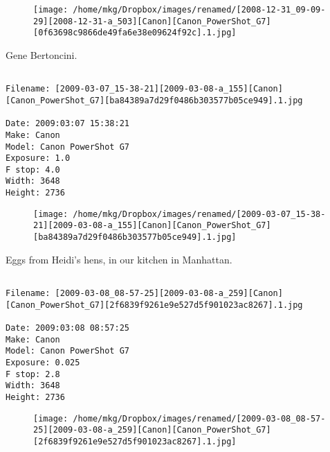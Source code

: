\begin{figure}
\texttt{[image: /home/mkg/Dropbox/images/renamed/[2008-12-31\_09-09-29][2008-12-31-a\_503][Canon][Canon\_PowerShot\_G7][0f63698c9866de49fa6e38e09624f92c].1.jpg]}
\end{figure}
    
\clearpage
\onecolumn
\noindent Gene Bertoncini.
\noindent
\begin{lstlisting}

Filename: [2009-03-07_15-38-21][2009-03-08-a_155][Canon][Canon_PowerShot_G7][ba84389a7d29f0486b303577b05ce949].1.jpg

Date: 2009:03:07 15:38:21
Make: Canon
Model: Canon PowerShot G7
Exposure: 1.0
F stop: 4.0
Width: 3648
Height: 2736
\end{lstlisting}
\clearpage

\begin{figure}
\texttt{[image: /home/mkg/Dropbox/images/renamed/[2009-03-07\_15-38-21][2009-03-08-a\_155][Canon][Canon\_PowerShot\_G7][ba84389a7d29f0486b303577b05ce949].1.jpg]}
\end{figure}
    
\clearpage
\onecolumn
\noindent Eggs from Heidi's hens, in our kitchen in Manhattan.
\noindent
\begin{lstlisting}

Filename: [2009-03-08_08-57-25][2009-03-08-a_259][Canon][Canon_PowerShot_G7][2f6839f9261e9e527d5f901023ac8267].1.jpg

Date: 2009:03:08 08:57:25
Make: Canon
Model: Canon PowerShot G7
Exposure: 0.025
F stop: 2.8
Width: 3648
Height: 2736
\end{lstlisting}
\clearpage

\begin{figure}
\texttt{[image: /home/mkg/Dropbox/images/renamed/[2009-03-08\_08-57-25][2009-03-08-a\_259][Canon][Canon\_PowerShot\_G7][2f6839f9261e9e527d5f901023ac8267].1.jpg]}
\end{figure}
    
